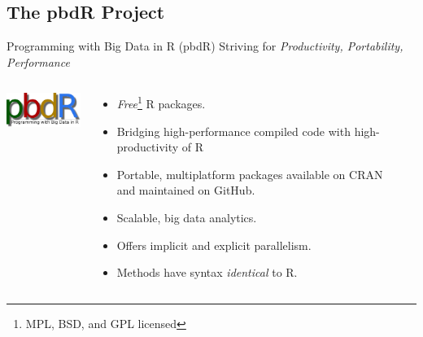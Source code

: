 \subsection{The pbdR Project}
\makesubcontentsslidessec


\begin{frame}
  \begin{block}{Programming with Big Data in R (pbdR)}
       \centering Striving for \emph{Productivity, Portability, Performance}\\[.4cm]\pause
  \begin{columns}[onlytextwidth]
    \begin{column}{0.30\textwidth}
      \centering
       \includegraphics[width=3.4cm]{../common/pics/simple}\\[.2cm]
    \end{column}
    \begin{column}{0.65\textwidth}
  \begin{itemize}[<+-|alert@+>]
    \item \emph{Free}\footnote{MPL, BSD, and GPL licensed} R packages.
    \item Bridging high-performance compiled code with high-productivity of R
    \item Portable, multiplatform packages available on CRAN and maintained on 
GitHub.
    \item Scalable, big data analytics.
    \item Offers implicit and explicit parallelism.
    \item Methods have syntax \emph{identical} to R.
  \end{itemize}
    \end{column}
​  \end{columns}
\end{block}
\end{frame}





